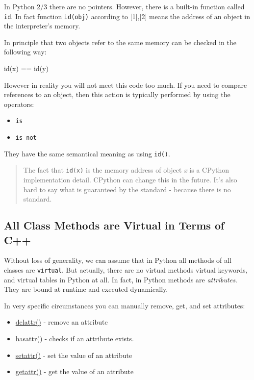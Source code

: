 \documentclass[
]{article}
\newenvironment{Shaded}{}{}
\newcommand{\BuiltInTok}[1]{#1}
\newcommand{\NormalTok}[1]{#1}
\newcommand{\OperatorTok}[1]{\textcolor[rgb]{0.40,0.40,0.40}{#1}}
\begin{document}
In Python 2/3 there are no pointers. However, there is a built-in
function called \texttt{id}. In fact function \texttt{id(obj)} according
to {[}1{]},{[}2{]} means the address of an object in the interpreter's
memory.

In principle that two objects refer to the same memory can be checked in
the following way:

\begin{Shaded}
\begin{Highlighting}[]
\BuiltInTok{id}\NormalTok{(x) }\OperatorTok{==} \BuiltInTok{id}\NormalTok{(y)}
\end{Highlighting}
\end{Shaded}

However in reality you will not meet this code too much. If you need to
compare references to an object, then this action is typically performed
by using the operators:

\begin{itemize}
\item
  \texttt{is}
\item
  \texttt{is\ not}
\end{itemize}

They have the same semantical meaning as using \texttt{id()}.

\begin{quote}
The fact that \texttt{id(x)} is the memory address of object \emph{x} is
a CPython implementation detail. CPython can change this in the future.
It's also hard to say what is guaranteed by the standard - because there
is no standard.
\end{quote}

\hypertarget{all-class-methods-are-virtual-in-terms-of-c}{%
\subsection{All Class Methods are Virtual in Terms of
C++}\label{all-class-methods-are-virtual-in-terms-of-c}}

Without loss of generality, we can assume that in Python all methods of
all classes are \texttt{virtual}. But actually, there are no virtual
methods virtual keywords, and virtual tables in Python at all. In fact,
in Python methods are \emph{attributes}. They are bound at runtime and
executed dynamically.

In very specific circumstances you can manually remove, get, and set
attributes:

\begin{itemize}
\item
  \href{https://docs.python.org/3/library/functions.html?highlight=getattr\#delattr}{delattr()}
  - remove an attribute
\item
  \href{https://docs.python.org/3/library/functions.html?highlight=getattr\#hasattr}{hasattr()}
  - checks if an attribute exists.
\item
  \href{https://docs.python.org/3/library/functions.html?highlight=getattr\#setattr}{setattr()}
  - set the value of an attribute
\item
  \href{https://docs.python.org/3/library/functions.html?highlight=getattr\#getattr}{getattr()}
  - get the value of an attribute
\end{itemize}
\end{document}
